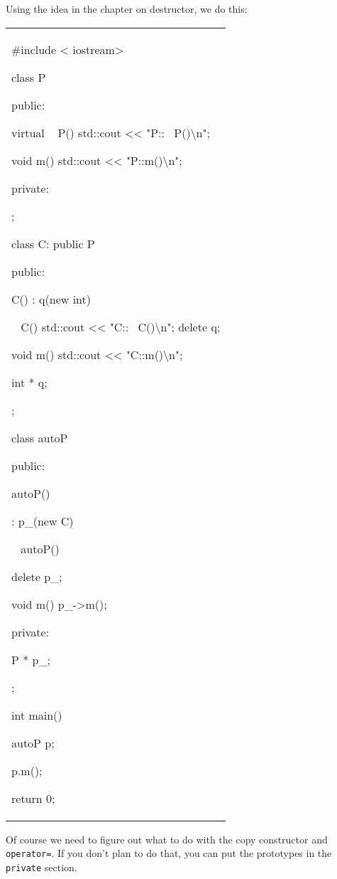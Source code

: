 Using the idea in the chapter on destructor, we do this:

\begin{longtable}[]{@{}
  >{\raggedright\arraybackslash}p{}@{}}
\toprule\noalign{}
 \\
\midrule\noalign{}
\endhead
\bottomrule\noalign{}
\endlastfoot
\#include < iostream\textgreater{}

class P

{

public:

\textbf{ }virtual ~ P() { std::cout <<{}
"P::~ P()\textbackslash n"; }

void m() { std::cout <<{} "P::m()\textbackslash n"; }

private:

};

class C: public P

{

public:

C() : q(new int) {}

~ C() { std::cout <<{}
"C::~ C()\textbackslash n"; delete q; }

void m() { std::cout <<{} "C::m()\textbackslash n"; }

int * q;

};

class autoP

{

public:

autoP()

: p_(new C)

{}

~ autoP()

{ delete p_; }

void m() { p_-\textgreater m(); }

private:

P * p_;

};

int main()

{

autoP p;

p.m();

return 0;

} \\
\end{longtable}

Of course we need to figure out what to do with the copy constructor and
\texttt{operator=}. If you don't plan to do that, you can put the
prototypes in the \texttt{private} section.

